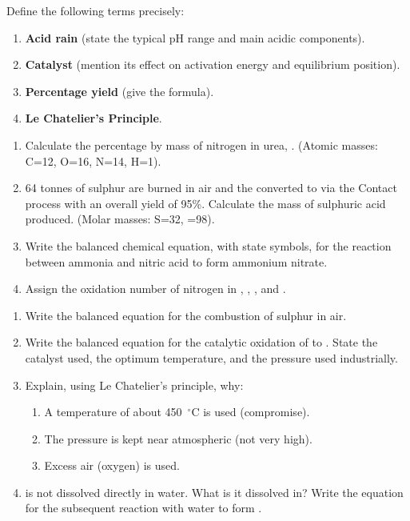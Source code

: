 \documentclass[11pt]{article}
\newcounter{popsec}
\newcounter{popsub}
\newcommand{\courssub}[1]{%
  \stepcounter{popsub}%
  \par\vspace{9pt}\noindent{\popxbold\fontsize{11.5}{13}\selectfont\color{popink}{\color{poporange}\thepopsec.\thepopsub}\hspace{6pt}#1}\par\nopagebreak\vspace{4pt}
}
\begin{document}
\begin{exercice}
Define the following terms precisely:
\begin{enumerate}
\item \textbf{Acid rain} (state the typical pH range and main acidic components).
\item \textbf{Catalyst} (mention its effect on activation energy and equilibrium position).
\item \textbf{Percentage yield} (give the formula).
\item \textbf{Le Chatelier's Principle}.
\end{enumerate}
\end{exercice}

\begin{exercice}
\begin{enumerate}
\item Calculate the percentage by mass of nitrogen in urea, . (Atomic masses: C=12, O=16, N=14, H=1).
\item 64 tonnes of sulphur are burned in air and the  converted to  via the Contact process with an overall yield of 95\%. Calculate the mass of sulphuric acid produced. (Molar masses: S=32, =98).
\item Write the balanced chemical equation, with state symbols, for the reaction between ammonia and nitric acid to form ammonium nitrate.
\item Assign the oxidation number of nitrogen in , , , and .
\end{enumerate}
\end{exercice}

\courssub{I practise}

\begin{exercice}
\begin{enumerate}
\item Write the balanced equation for the combustion of sulphur in air.
\item Write the balanced equation for the catalytic oxidation of  to . State the catalyst used, the optimum temperature, and the pressure used industrially.
\item Explain, using Le Chatelier's principle, why:
      \begin{enumerate}[label=(\alph*)]
      \item A temperature of about \SI{450}{\ensuremath{{}^{\circ}\mathrm{C}}} is used (compromise).
      \item The pressure is kept near atmospheric (not very high).
      \item Excess air (oxygen) is used.
      \end{enumerate}
\item {} is not dissolved directly in water. What is it dissolved in? Write the equation for the subsequent reaction with water to form .
\end{enumerate}
\end{exercice}
\end{document}
